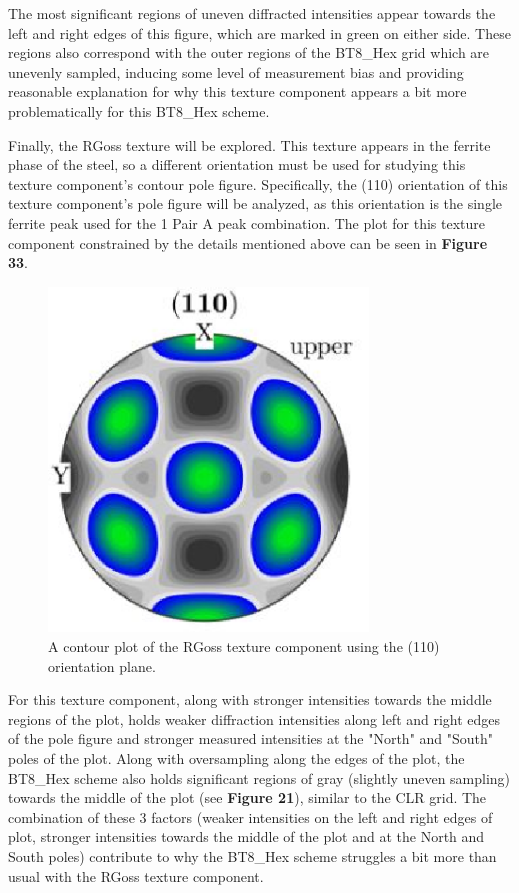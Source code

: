 \documentclass[10pt]{article}
\begin{document}
The most significant regions of uneven diffracted intensities appear towards the left and right edges of this figure, which are marked in green on either side.
These regions also correspond with the outer regions of the BT8\_Hex grid which are unevenly sampled, inducing some level of measurement bias and 
providing reasonable explanation for why this texture component appears a bit more problematically for this BT8\_Hex scheme.

Finally, the RGoss texture will be explored. This texture appears in the ferrite phase of the steel, so a different orientation must be 
used for studying this texture component's contour pole figure. Specifically, the (110) orientation of this texture component's pole figure will be 
analyzed, as this orientation is the single ferrite peak used for the 1 Pair A peak combination. The plot for this texture component constrained by the details mentioned 
above can be seen in \textbf{Figure 33}.
\begin{figure}[h]
    \centering
    \includegraphics[width=8.5cm]{fig33}
    \caption{\label{tab1}A contour plot of the RGoss texture component using the (110) orientation plane.} 
    \end{figure}

For this texture component, along with stronger intensities towards the middle regions of the plot, holds weaker diffraction intensities along left and 
right edges of the pole figure and stronger measured intensities at the "North" and "South" poles of the plot. Along with oversampling along the edges of the plot, 
the BT8\_Hex scheme also holds significant regions of gray (slightly uneven sampling) towards the middle of the plot (see \textbf{Figure 21}), similar to the CLR grid. The 
combination of these 3 factors (weaker intensities on the left and right edges of plot, stronger intensities towards the middle of the plot and at the North and South poles) 
contribute to why the BT8\_Hex scheme struggles a bit more than usual with the RGoss texture component.
\end{document}
